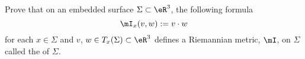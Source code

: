 \begin{exercice}\label{exo011}

 Prove that on an embedded surface  $\Sigma\subset\eR^3$, the following formula
\[
\mI_x(v,w):=v\cdot w
\]
for each $x\in\Sigma$ and  $v$, $w\in T_x(\Sigma)\subset\eR^3$
defines a Riemannian metric, $\mI$, on $\Sigma$ called the  of $\Sigma$.

\end{exercice}
